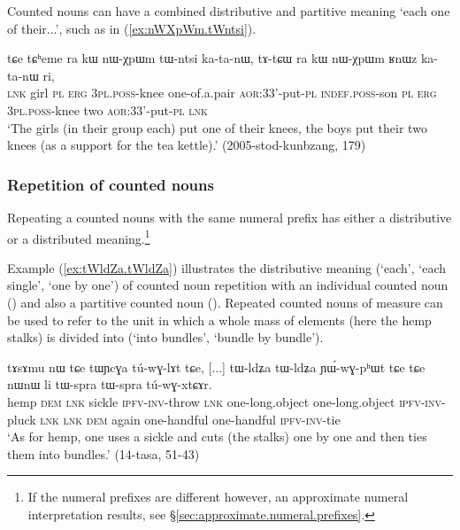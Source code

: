 Counted nouns can have a combined distributive and partitive meaning `each one of their...', such as  in (\ref{ex:nWXpWm.tWntsi}).

\begin{exe}
	\ex \label{ex:nWXpWm.tWntsi}
	\gll tɕe tɕʰeme ra kɯ nɯ-χpɯm tɯ-ntsi ka-ta-nɯ, tɤ-tɕɯ ra kɯ nɯ-χpɯm ʁnɯz ka-ta-nɯ ri,  \\
	\textsc{lnk} girl \textsc{pl} \textsc{erg} \textsc{3pl}.\textsc{poss}-knee one-of.a.pair \textsc{aor}:3\fl{}3'-put-\textsc{pl} \textsc{indef}.\textsc{poss}-son \textsc{pl} \textsc{erg}  \textsc{3pl}.\textsc{poss}-knee two \textsc{aor}:3\fl{}3'-put-\textsc{pl} \textsc{lnk} \\
	\glt `The girls (in their group each) put one of their knees, the boys put their two knees (as a support for the tea kettle).' (2005-stod-kunbzang, 179)
\end{exe}


\subsubsection{Repetition of counted nouns} \label{sec:CN.repetition}
Repeating a counted nouns with the same numeral prefix has either a distributive or a distributed meaning.\footnote{If the numeral prefixes are different however, an approximate numeral interpretation results, see §\ref{sec:approximate.numeral.prefixes}.}

Example (\ref{ex:tWldZa.tWldZa}) illustrates the distributive meaning (`each', `each single', `one by one') of counted noun repetition with an individual counted noun () and also a partitive counted noun  (). Repeated counted nouns of measure can be used to refer to the unit in which a whole mass of elements (here the hemp stalks) is divided into (`into bundles', `bundle by bundle').

\begin{exe}
	\ex \label{ex:tWldZa.tWldZa}
	\gll  tɤsɤmu nɯ tɕe tɯɲcɣa tú-wɣ-lɤt tɕe, [...] tɯ-ldʑa tɯ-ldʑa ɲɯ́-wɣ-pʰɯt tɕe tɕe nɯnɯ li tɯ-spra tɯ-spra tú-wɣ-xtɕɤr. \\
	hemp \textsc{dem} \textsc{lnk} sickle \textsc{ipfv}-\textsc{inv}-throw \textsc{lnk} { } one-long.object one-long.object \textsc{ipfv}-\textsc{inv}-pluck \textsc{lnk} \textsc{lnk} \textsc{dem} again one-handful one-handful \textsc{ipfv}-\textsc{inv}-tie  \\
	\glt `As for hemp, one uses a sickle and cuts (the stalks) one by one and then ties them into bundles.'  (14-tasa, 51-43)
\end{exe}

